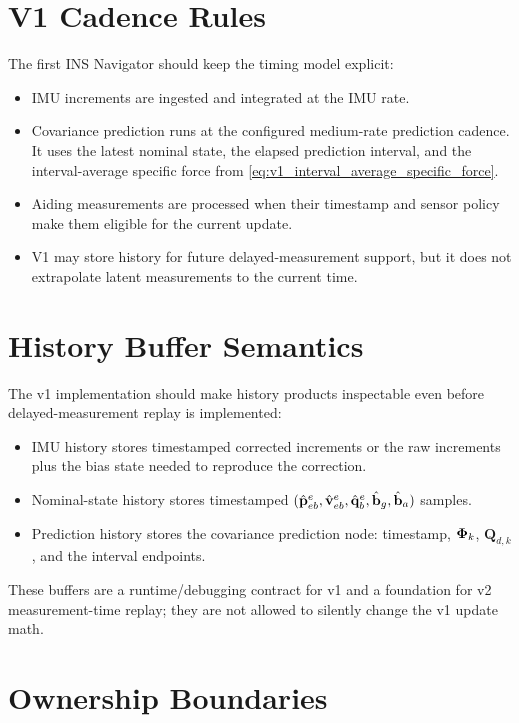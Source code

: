 \section{V1 Cadence Rules}

The first INS Navigator should keep the timing model explicit:
\begin{itemize}
    \item IMU increments are ingested and integrated at the IMU rate.
    \item Covariance prediction runs at the configured medium-rate prediction
    cadence. It uses the latest nominal state, the elapsed prediction interval,
    and the interval-average specific force from
    \cref{eq:v1_interval_average_specific_force}.
    \item Aiding measurements are processed when their timestamp and sensor
    policy make them eligible for the current update.
    \item V1 may store history for future delayed-measurement support, but it
    does not extrapolate latent measurements to the current time.
\end{itemize}

\section{History Buffer Semantics}

The v1 implementation should make history products inspectable even before
delayed-measurement replay is implemented:
\begin{itemize}
    \item IMU history stores timestamped corrected increments or the raw
    increments plus the bias state needed to reproduce the correction.
    \item Nominal-state history stores timestamped
    $(\hat{\mathbf{p}}_{eb}^{e},\hat{\mathbf{v}}_{eb}^{e},\hat{\mathbf{q}}_{b}^{e},
    \hat{\mathbf{b}}_g,\hat{\mathbf{b}}_a)$ samples.
    \item Prediction history stores the covariance prediction node:
    timestamp, $\boldsymbol{\Phi}_k$, $\mathbf{Q}_{d,k}$, and the interval endpoints.
\end{itemize}
These buffers are a runtime/debugging contract for v1 and a foundation for v2
measurement-time replay; they are not allowed to silently change the v1 update
math.

\section{Ownership Boundaries}

